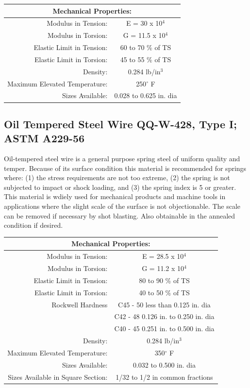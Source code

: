 \documentclass[10pt]{article}
\begin{document}
\begin{center}
\begin{tabular}{ r c }
\multicolumn{2}{c}{Mechanical Properties:} \\
\hline
Modulus in Tension: & E = 30 x 10$^4$ \\  
Modulus in Torsion: & G = 11.5 x 10$^4$ \\
Elastic Limit in Tension: & 60 to 70 \% of TS \\  
Elastic Limit in Torsion: & 45 to 55 \% of TS \\
Density: & 0.284 lb/in$^3$ \\
Maximum Elevated Temperature: & 250$^\circ$ F \\
Sizes Available: & 0.028 to 0.625 in. dia \\
\hline
\end{tabular}
\end{center}

\subsection{Oil Tempered Steel Wire QQ-W-428, Type I; ASTM A229-56} %
Oil-tempered steel wire is a general purpose spring steel of uniform quality and temper.
Because of its surface condition this material is recommended for springs where: (1) the stress requirements are not too extreme, (2) the spring is not subjected to impact or shock loading, and (3) the spring index is 5 or greater.
This material is wdiely used for mechanical products and machine tools in applications where the slight scale of the surface is not objectionable.
The scale can be removed if necessary by shot blasting.
Also obtainable in the annealed condition if desired.

\begin{center}
\begin{tabular}{ r c }
\multicolumn{2}{c}{Mechanical Properties:} \\
\hline
Modulus in Tension: & E = 28.5 x 10$^4$ \\  
Modulus in Torsion: & G = 11.2 x 10$^4$ \\
Elastic Limit in Tension: & 80 to 90 \% of TS \\  
Elastic Limit in Torsion: & 40 to 50 \% of TS \\
Rockwell Hardness & C45 - 50 less than 0.125 in. dia\\
& C42 - 48 0.126 in. to 0.250 in. dia\\
& C40 - 45 0.251 in. to 0.500 in. dia\\
Density: & 0.284 lb/in$^3$ \\
Maximum Elevated Temperature: & 350$^\circ$ F \\
Sizes Available: & 0.032 to 0.500 in. dia \\
Sizes Available in Square Section: & 1/32 to 1/2 in common fractions \\
\hline
\end{tabular}
\end{center}
\end{document}
